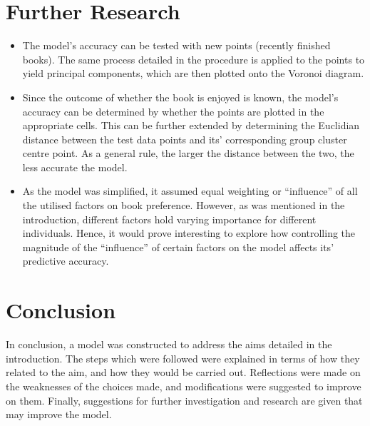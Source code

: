 \documentclass[12pt]{article}
\begin{document}
\section{Further Research}
\begin{itemize}
    \item The model’s accuracy can be tested with new points (recently finished books). The same process detailed in the procedure is applied to the points to yield principal components, which are then plotted onto the Voronoi diagram.
    \item Since the outcome of whether the book is enjoyed is known, the model’s accuracy can be determined by whether the points are plotted in the appropriate cells. This can be further extended by determining the Euclidian distance between the test data points and its’ corresponding group cluster centre point. As a general rule, the larger the distance between the two, the less accurate the model.
    \item As the model was simplified, it assumed equal weighting or “influence” of all the utilised factors on book preference. However, as was mentioned in the introduction, different factors hold varying importance for different individuals. Hence, it would prove interesting to explore how controlling the magnitude of the “influence” of certain factors on the model affects its’ predictive accuracy.
\end{itemize}

\section{Conclusion}
In conclusion, a model was constructed to address the aims detailed in the introduction. The steps which were followed were explained in terms of how they related to the aim, and how they would be carried out. Reflections were made on the weaknesses of the choices made, and modifications were suggested to improve on them. Finally, suggestions for further investigation and research are given that may improve the model.

\printbibliography[heading=bibintoc,title={References}]
\end{document}
